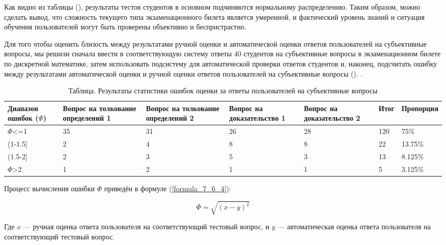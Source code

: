 Как видно из таблицы (\textit{}), результаты тестов студентов в основном подчиняются нормальному распределению. Таким образом, можно сделать вывод, что  сложность текущего типа экзаменационного билета является умеренной, и фактический уровень знаний и ситуация обучения пользователей могут быть проверены объективно и беспристрастно.

Для того чтобы оценить близость между результатами ручной оценки и автоматической оценки ответов пользователей на субъективные вопросы, мы решили сначала ввести в соответствующую систему ответы 40 студентов на субъективные вопросы в экзаменационном билете по дискретной математике, затем использовать подсистему для автоматической проверки ответов студентов и, наконец, подсчитать ошибку между результатами автоматической оценки и ручной оценки ответов пользователей на субъективные вопросы (\textit{}). .

\begin{table}[!htbp]
	\centering
	\caption{Таблица. Результаты статистики ошибок оценки за ответы пользователей на субъективные вопросы}
	\label{tab:error_statistics_result}
		\begin{tabular}{|p{}|p{}|p{}|p{}|p{}|p{}|p{}|} 
			\hline 
			Диапазон ошибок ($\Phi $) & Вопрос на  толкование  определений 1 & Вопрос на  толкование  определений 2 & Вопрос на  доказательство 1 & Вопрос на  доказательство 2 & Итог & Пропорция \\
			\hline  
			$\Phi$<=1 & 35 & 31 & 26 & 28 & 120 & 75\% \\
			\hline
			(1-1.5] & 2 & 4 & 8 & 8 & 22 & 13.75\% \\
			\hline
			(1.5-2] & 2 & 3 & 5 & 3 & 13 & 8.125\% \\
			\hline
			$\Phi$>2 & 1 & 2 & 1 & 1 & 5 & 3.125\% \\
			\hline
		\end{tabular}
\end{table}

Процесс вычисления ошибки $\Phi $ приведён в формуле (\ref{formula_7_6_4}):

\begin{equation}    
	\Phi =\sqrt{\left ( x -y \right ) ^{2} }   
	\label{formula_7_6_4} 
\end{equation}

Где $x$ --- ручная оценка ответа пользователя на соответствующий тестовый вопрос, и $y$ --- автоматическая оценка ответа пользователя на соответствующий тестовый вопрос.

